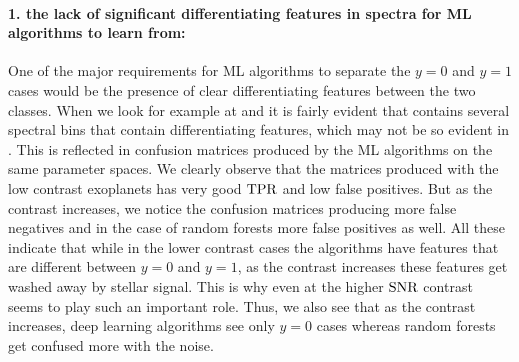 \paragraph{1. the lack of significant differentiating features in spectra for ML algorithms to learn from:\\}
One of the major requirements for ML algorithms to separate the $y=0$ and $y=1$ cases would be the presence of clear differentiating features between the two classes.
When we look for example at  and  it is fairly evident that  contains several spectral bins that contain differentiating features, which may not be so evident in .
This is reflected in confusion matrices produced by the ML algorithms on the same parameter spaces.
We clearly observe that the matrices produced with the low contrast exoplanets has very good $\rm{TPR}$ and low false positives.
But as the contrast increases, we notice the confusion matrices producing more false negatives and in the case of random forests more false positives as well.
All these indicate that while in the lower contrast cases the algorithms have features that are different between $y=0$ and $y=1$, as the contrast increases these features get washed away by stellar signal.
This is why even at the higher $\rm{SNR}$ contrast seems to play such an important role.
Thus, we also see that as the contrast increases, deep learning algorithms see only $y=0$ cases whereas random forests get confused more with the noise.

